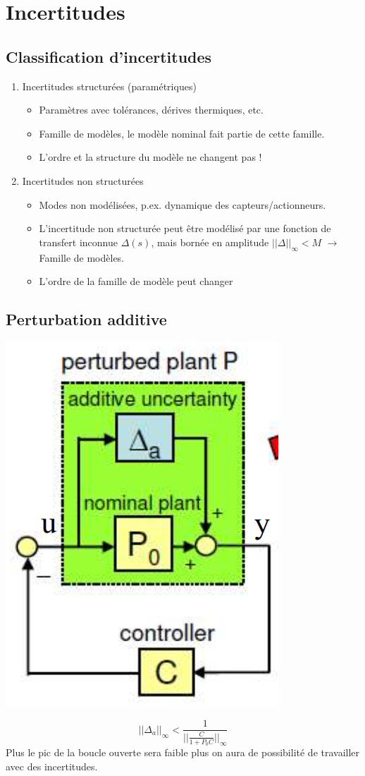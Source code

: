 \documentclass[resume]{subfiles}
\begin{document}
\section{Incertitudes}

\subsection{Classification d'incertitudes}
\begin{enumerate}
\item Incertitudes structurées (paramétriques)
	\begin{itemize}
	\item Paramètres avec tolérances, dérives thermiques, etc.
	\item Famille de modèles, le modèle nominal fait partie de cette famille.
	\item L'ordre et la structure du modèle ne changent pas !
	\end{itemize}
\item Incertitudes non structurées
	\begin{itemize}
	\item Modes non modélisées, p.ex. dynamique des capteurs/actionneurs.
	\item L'incertitude non structurée peut être modélisé par une fonction de transfert inconnue $\Delta(s)$, mais bornée en amplitude $||\Delta||_{\infty}< M$ $\rightarrow$ Famille de modèles.
   \item L'ordre de la famille de modèle peut changer
   \end{itemize}
\end{enumerate}

\subsection{Perturbation additive}
\begin{center}
\includegraphics[width=0.5\columnwidth]{FiguresTypora/image-20220602100435357.png}
\end{center}
$$
||\Delta_a||_{\infty} < \frac{1}{||\frac{C}{1+P_0C}||_{\infty}}
$$
Plus le pic de la boucle ouverte sera faible plus on aura de possibilité de travailler avec des incertitudes.
\end{document}
